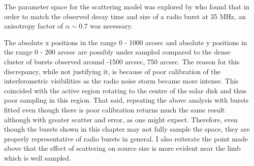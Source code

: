 
The parameter space for the scattering model was explored by \cite{Zhang2021} who found that in order to match the observed decay time and size of a radio burst at 35 MHz, an anisotropy factor of $\alpha \sim 0.7$ was necessary. %

The absolute x positions in the range 0 - 1000 arcsec and absolute y positions in the range 0 - 200 arcsec are  possibly under sampled compared to the dense cluster of bursts observed around -1500 arcsec, 750 arcsec. The reason for this discrepancy, while not justifying it, is because of poor calibration of the interferometric visibilities as the radio noise storm became more intense. This coincided with the active region rotating to the centre of the solar disk and thus poor sampling in this region. That said, repeating the above analysis with bursts fitted even though there is poor calibration returns much the same result although with greater scatter and error, as one might expect. Therefore, even though the bursts shown in this chapter may not fully sample the space, they are properly representative of radio bursts in general. I also reiterate the point made above that the effect of scattering on source size is more evident near the limb which is well sampled. 

